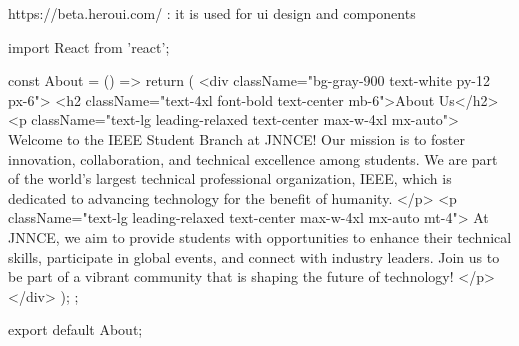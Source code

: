 https://beta.heroui.com/ : it is used for ui design and components


import React from 'react';

const About = () => {
    return (
        <div className="bg-gray-900 text-white py-12 px-6">
            <h2 className="text-4xl font-bold text-center mb-6">About Us</h2>
            <p className="text-lg leading-relaxed text-center max-w-4xl mx-auto">
                Welcome to the IEEE Student Branch at JNNCE! Our mission is to foster innovation, collaboration, and technical excellence among students.
                We are part of the world's largest technical professional organization, IEEE, which is dedicated to advancing technology for the benefit of humanity.
            </p>
            <p className="text-lg leading-relaxed text-center max-w-4xl mx-auto mt-4">
                At JNNCE, we aim to provide students with opportunities to enhance their technical skills, participate in global events, and connect with industry leaders.
                Join us to be part of a vibrant community that is shaping the future of technology!
            </p>
        </div>
    );
};

export default About;